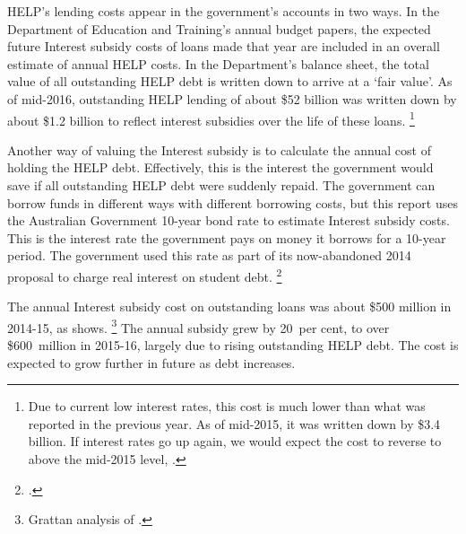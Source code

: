 \documentclass{grattan}
\begin{document}
\gls{HELP}'s lending costs appear in the government's accounts in two ways.
In the Department of Education and Training's annual budget papers, the expected future \gls{Interest subsidy} costs of loans made that year are included in an overall estimate of annual \gls{HELP} costs.
In the Department's balance sheet, the total value of all outstanding \gls{HELP} debt is written down to arrive at a `fair value'.
As of mid-2016, outstanding \gls{HELP} lending of about \$52 billion was written down by about \$1.2 billion to reflect interest subsidies over the life of these loans.%
   \footnote{Due to current low interest rates, this cost is much lower than what was reported in the previous year. As of mid-2015, it was written down by \$3.4 billion. If interest rates go up again, we would expect the cost to reverse to above the mid-2015 level, \textcite[][176]{Education2016Annualreport}.}

Another way of valuing the \gls{Interest subsidy} is to calculate the annual cost of holding the \gls{HELP} debt.
Effectively, this is the interest the government would save if all outstanding \gls{HELP} debt were suddenly repaid.
The government can borrow funds in different ways with different borrowing costs, but this report uses the Australian Government \mbox{10-year} bond rate to estimate \gls{Interest subsidy} costs.
This is the interest rate the government pays on money it borrows for a 10-year period.
The government used this rate as part of its now-abandoned 2014 proposal to charge real interest on student debt.%
\footcite{Australia2014HigherEducationResearch}

The annual \gls{Interest subsidy} cost on outstanding loans was about \$500 million in 2014-15, as  shows.%
   \footnote{Grattan analysis of \textcites{ABS2016ConsumerPriceIndex}{RBA-2015-f2Capitalmarketyields}{RBA2016F21Capitalmarket}.} 
The annual subsidy grew by 20~per cent, to over \$600~million in 2015-16, largely due to rising outstanding \gls{HELP} debt.
The cost is expected to grow further in future as debt increases.
\end{document}
